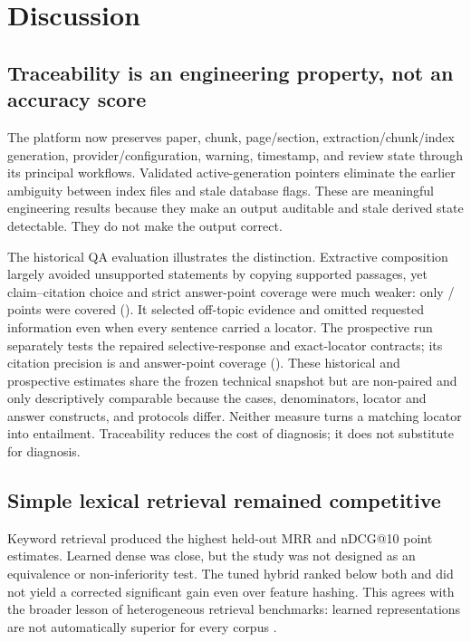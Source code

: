 \chapter{Discussion}
\label{ch:discussion}

\section{Traceability is an engineering property, not an accuracy score}

The platform now preserves paper, chunk, page/section, extraction/chunk/index generation, provider/configuration, warning, timestamp, and review state through its principal workflows. Validated active-generation pointers eliminate the earlier ambiguity between index files and stale database flags. These are meaningful engineering results because they make an output auditable and stale derived state detectable. They do not make the output correct.

The historical QA evaluation illustrates the distinction. Extractive composition largely avoided unsupported statements by copying supported passages, yet claim--citation choice and strict answer-point coverage were much weaker: only \QaCoveredAnswerPointCount{}/\QaAnswerPointCount{} points were covered (\QaAnswerPointCoverage{}). It selected off-topic evidence and omitted requested information even when every sentence carried a locator. The prospective run separately tests the repaired selective-response and exact-locator contracts; its citation precision is \VTwoQACitationLocatorPrecision{} and answer-point coverage \VTwoQAAnswerPointCoverage{} (\VTwoQAAnswerPointCoverageCi{}). These historical and prospective estimates share the frozen technical snapshot but are non-paired and only descriptively comparable because the cases, denominators, locator and answer constructs, and protocols differ. Neither measure turns a matching locator into entailment. Traceability reduces the cost of diagnosis; it does not substitute for diagnosis.

\section{Simple lexical retrieval remained competitive}

Keyword retrieval produced the highest held-out MRR and nDCG@10 point estimates. Learned dense was close, but the study was not designed as an equivalence or non-inferiority test. The tuned hybrid ranked below both and did not yield a corrected significant gain even over feature hashing. This agrees with the broader lesson of heterogeneous retrieval benchmarks: learned representations are not automatically superior for every corpus \cite{thakur2021beir}.

